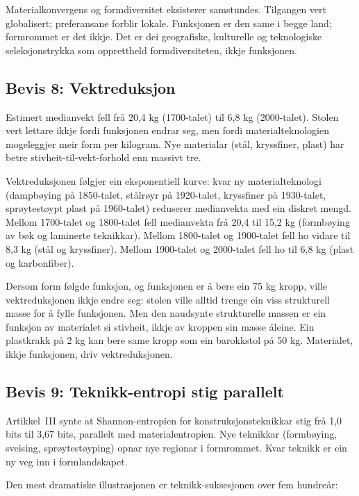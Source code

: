 \documentclass[10pt, a4paper, twocolumn]{article}
\begin{document}
Materialkonvergens og formdiversitet eksisterer samstundes. Tilgangen vert globalisert; preferansane forblir lokale. Funksjonen er den same i begge land; formrommet er det ikkje. Det er dei geografiske, kulturelle og teknologiske seleksjonstrykka som opprettheld formdiversiteten, ikkje funksjonen.


\subsection{Bevis 8: Vektreduksjon}

Estimert medianvekt fell frå 20,4 kg (1700-talet) til 6,8 kg (2000-talet). Stolen vert lettare ikkje fordi funksjonen endrar seg, men fordi materialteknologien mogeleggjer meir form per kilogram. Nye materialar (stål, kryssfiner, plast) har betre stivheit-til-vekt-forhold enn massivt tre.

Vektreduksjonen følgjer ein eksponentiell kurve: kvar ny materialteknologi (dampbøying på 1850-talet, stålrøyr på 1920-talet, kryssfiner på 1930-talet, sprøytestøypt plast på 1960-talet) reduserer medianvekta med ein diskret mengd. Mellom 1700-talet og 1800-talet fell medianvekta frå 20,4 til 15,2 kg (formbøying av bøk og laminerte teknikkar). Mellom 1800-talet og 1900-talet fell ho vidare til 8,3 kg (stål og kryssfiner). Mellom 1900-talet og 2000-talet fell ho til 6,8 kg (plast og karbonfiber).

Dersom form følgde funksjon, og funksjonen er å bere ein 75 kg kropp, ville vektreduksjonen ikkje endre seg: stolen ville alltid trenge ein viss strukturell masse for å fylle funksjonen. Men den naudsynte strukturelle massen er ein funksjon av materialet si stivheit, ikkje av kroppen sin masse åleine. Ein plastkrakk på 2 kg kan bere same kropp som ein barokkstol på 50 kg. Materialet, ikkje funksjonen, driv vektreduksjonen.


\subsection{Bevis 9: Teknikk-entropi stig parallelt}

Artikkel~III synte at Shannon-entropien for konstruksjonsteknikkar stig frå 1,0 bits til 3,67 bits, parallelt med materialentropien. Nye teknikkar (formbøying, sveising, sprøytestøyping) opnar nye regionar i formrommet. Kvar teknikk er ein ny veg inn i formlandskapet.

Den mest dramatiske illustrasjonen er teknikk-suksesjonen over fem hundreår:
\end{document}
